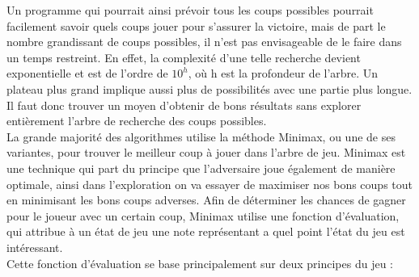 \documentclass[10pt,a4paper]{article}
\begin{document}
Un programme qui pourrait ainsi prévoir tous les coups possibles pourrait facilement savoir quels coups jouer pour s'assurer la victoire, mais de part le nombre grandissant de coups possibles, il n'est pas envisageable de le faire dans un temps restreint. En effet, la complexité d'une telle recherche devient exponentielle et est de l'ordre de \begin{math}10^h\end{math}\cite{And07}, où h est la profondeur de l'arbre. Un plateau plus grand implique aussi plus de possibilités avec une partie plus longue. Il faut donc trouver un moyen d'obtenir de bons résultats sans explorer entièrement l'arbre de recherche des coups possibles.\\

La grande majorité des algorithmes utilise la méthode Minimax, ou une de ses variantes, pour trouver le meilleur coup à jouer dans l'arbre de jeu. Minimax est une technique qui part du principe que l'adversaire joue également de manière optimale, ainsi dans l'exploration on va essayer de maximiser nos bons coups tout en minimisant les bons coups adverses. Afin de déterminer les chances de gagner pour le joueur avec un certain coup, Minimax utilise une fonction d'évaluation, qui attribue à un état de jeu une note représentant a quel point l'état du jeu est intéressant.\\

Cette fonction d'évaluation se base principalement sur deux principes du jeu :\\
\end{document}
